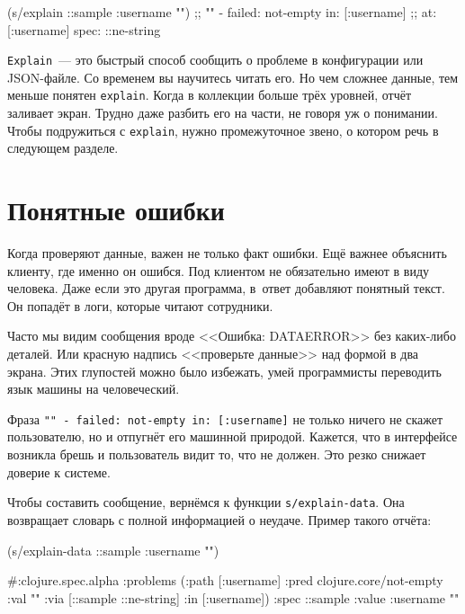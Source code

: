\begin{english}
  \begin{clojure}
(s/explain ::sample {:username ""})
;; "" - failed: not-empty in: [:username]
;; at: [:username] spec: ::ne-string
  \end{clojure}
\end{english}

\verb|Explain|~--- это быстрый способ сообщить о проблеме в конфигурации или
JSON-файле. Со временем вы научитесь читать его. Но чем сложнее данные, тем
меньше понятен \verb|explain|. Когда в коллекции больше трёх уровней,
отчёт заливает экран. Трудно даже разбить его на части, не говоря уж о
понимании. Чтобы подружиться с \verb|explain|, нужно промежуточное звено, о
котором речь в следующем разделе.

\section{Понятные ошибки}


\label{spec-messages}

Когда проверяют данные, важен не только факт ошибки. Ещё важнее объяснить
клиенту, где именно он ошибся. Под клиентом не обязательно имеют в виду
человека. Даже если это другая программа, в~ответ добавляют понятный текст. Он
попадёт в логи, которые читают сотрудники.

Часто мы видим сообщения вроде <<Ошибка: DATAERROR>> без каких-либо деталей. Или
красную надпись <<проверьте данные>> над формой в два экрана. Этих глупостей
можно было избежать, умей программисты переводить язык машины на человеческий.


Фраза \verb|"" - failed: not-empty in: [:username]| не только ничего не скажет
пользователю, но и отпугнёт его машинной природой. Кажется, что в интерфейсе
возникла брешь и пользователь видит то, что не должен. Это резко снижает
доверие к системе.

Чтобы составить сообщение, вернёмся к функции \verb|s/explain-data|. Она
возвращает словарь с полной информацией о неудаче. Пример такого отчёта:

\begin{english}
  \begin{clojure}
(s/explain-data ::sample {:username ""})

#:clojure.spec.alpha
{:problems
 ({:path [:username]
   :pred clojure.core/not-empty
   :val ""
   :via [::sample ::ne-string]
   :in [:username]})
 :spec ::sample
 :value {:username ""}}
  \end{clojure}
\end{english}


